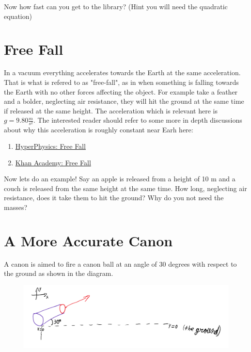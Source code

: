 \documentclass[12pt]{article}
\begin{document}
Now how fast can you get to the library? (Hint you will need the quadratic equation)

\parbox[][12cm][t]{8cm}{}

\section{Free Fall}
In a vacuum everything accelerates towards the Earth at the same acceleration. That is what is refered to as "free-fall", as in when something is falling towards the Earth with no other forces affecting the object. For example take a feather and a bolder, neglecting air resistance, they will hit the ground at the same time if released at the same height. The acceleration which is relevant here is $g = 9.80 \frac{m}{s^2}$. The interested reader should refer to some more in depth discussions about why this acceleration is roughly constant near Earh here:

\begin{enumerate}
  \item \href{http://hyperphysics.phy-astr.gsu.edu/hbasees/Class/PhSciLab/freefall.html}{HyperPhysics: Free Fall}
  \item \href{https://www.khanacademy.org/science/ap-physics-1/ap-one-dimensional-motion/falling-objects-ap-physics/a/freefall-ap1}{Khan Academy: Free Fall}
\end{enumerate}

Now lets do an example! Say an apple is released from a height of 10 m and a couch is released from the same height at the same time. How long, neglecting air resistance, does it take them to hit the ground? Why do you not need the masses?

\parbox[][12cm][t]{8cm}{}

\section{A More Accurate Canon}
A canon is aimed to fire a canon ball at an angle of 30 degrees with respect to the ground as shown in the diagram.

\begin{figure}[h]
\includegraphics[scale=0.20]{TheCanons.png}
\end{figure}
\end{document}
